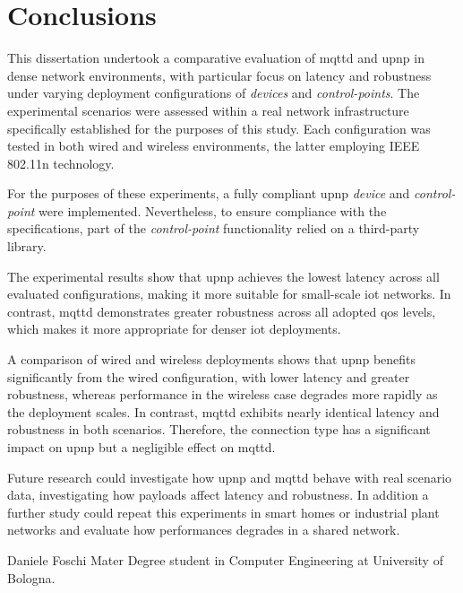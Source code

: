 \documentclass[lettersize,journal]{IEEEtran}
\begin{document}
\section{Conclusions}
\label{sec_conclusions}
This dissertation undertook a comparative evaluation of \gls{mqttd} and \gls{upnp} in dense network environments, with particular focus on latency and robustness under varying deployment configurations of \textit{devices} and \textit{control-points}. The experimental scenarios were assessed within a real network infrastructure specifically established for the purposes of this study. Each configuration was tested in both wired and wireless environments, the latter employing IEEE 802.11n technology.

For the purposes of these experiments, a fully compliant \gls{upnp} \textit{device} and \textit{control-point} were implemented. Nevertheless, to ensure compliance with the specifications, part of the \textit{control-point} functionality relied on a third-party library.

The experimental results show that \gls{upnp} achieves the lowest latency across all evaluated configurations, making it more suitable for small-scale \gls{iot} networks. In contrast, \gls{mqttd} demonstrates greater robustness across all adopted \gls{qos} levels, which makes it more appropriate for denser \gls{iot} deployments.

A comparison of wired and wireless deployments shows that \gls{upnp} benefits significantly from the wired configuration, with lower latency and greater robustness, whereas performance in the wireless case degrades more rapidly as the deployment scales. In contrast, \gls{mqttd} exhibits nearly identical latency and robustness in both scenarios. Therefore, the connection type has a significant impact on \gls{upnp} but a negligible effect on \gls{mqttd}.

Future research could investigate how \gls{upnp} and \gls{mqttd} behave with real scenario data, investigating how payloads affect latency and robustness. In addition a further study could repeat this experiments in smart homes or industrial plant networks and evaluate how performances degrades in a shared network.


\printglossary[type=\acronymtype]


\appendix



\begin{IEEEbiographynophoto}{Daniele Foschi}
Mater Degree student in Computer Engineering at University of Bologna.
\end{IEEEbiographynophoto}



\end{document}
